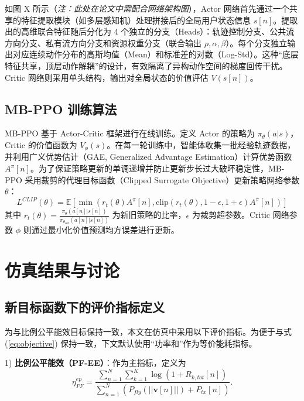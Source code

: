 \documentclass[journal,onecolumn]{IEEEtran}
\begin{document}
	如图 X 所示（\textit{注：此处在论文中需配合网络架构图}），Actor 网络首先通过一个共享的特征提取模块（如多层感知机）处理拼接后的全局用户状态信息 $s[n]$。提取出的高维联合特征随后分化为 4 个独立的分支（Heads）：轨迹控制分支、公共流方向分支、私有流方向分支和资源权重分支（联合输出 $\rho,\alpha,\beta$）。每个分支独立输出对应连续动作分布的高斯均值（Mean）和标准差的对数（Log-Std）。这种“底层特征共享，顶层动作解耦”的设计，有效隔离了异构动作空间的梯度回传干扰。Critic 网络则采用单头结构，输出对全局状态的价值评估 $V(s[n])$。
	
	\subsection{MB-PPO 训练算法}
	MB-PPO 基于 Actor-Critic 框架进行在线训练。定义 Actor 的策略为 $\pi_\theta(a|s)$，Critic 的价值函数为 $V_\phi(s)$。在每一轮训练中，智能体收集一批经验轨迹数据，并利用广义优势估计（GAE, Generalized Advantage Estimation）计算优势函数 $A^{\pi}[n]$。为了保证策略更新的单调递增并防止更新步长过大破坏稳定性，MB-PPO 采用裁剪的代理目标函数（Clipped Surrogate Objective）更新策略网络参数 $\theta$：
	\begin{equation}
		L^{CLIP}(\theta) = \mathbb{E} \left[ \min(r_t(\theta) A^{\pi}[n], \text{clip}(r_t(\theta), 1-\epsilon, 1+\epsilon) A^{\pi}[n]) \right]
		\label{eq:ppo_clip}
	\end{equation}
	其中 $r_t(\theta) = \frac{\pi_\theta(a[n]|s[n])}{\pi_{\theta_{old}}(a[n]|s[n])}$ 为新旧策略的比率，$\epsilon$ 为裁剪超参数。Critic 网络参数 $\phi$ 则通过最小化价值预测均方误差进行更新。
	
	
	\section{仿真结果与讨论}
	\subsection{新目标函数下的评价指标定义}
	为与比例公平能效目标保持一致，本文在仿真中采用以下评价指标。为便于与式 (\ref{eq:objective}) 保持一致，下文默认使用“功率和”作为等价能耗指标。
	
	1) \textbf{比例公平能效（PF-EE）}：作为主指标，定义为
	\begin{equation}
		\eta_{PF}^{ep}=\frac{\sum_{n=1}^{N}\sum_{k=1}^{K}\log\left(1+R_{k,tot}[n]\right)}{\sum_{n=1}^{N}\left(P_{fly}(||\mathbf{v}[n]||)+P_{tx}[n]\right)}.
		\label{eq:metric_pf_ee}
	\end{equation}
	
\end{document}
